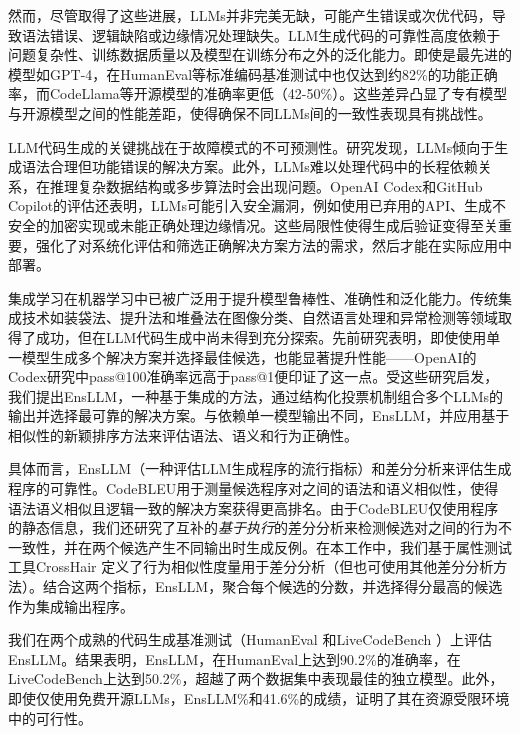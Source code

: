 \documentclass{article}
\newcommand{\tool}{EnsLLM}
\begin{document}
\begin{CJK*}{UTF8}{gbsn}
然而，尽管取得了这些进展，LLMs并非完美无缺，可能产生错误或次优代码，导致语法错误、逻辑缺陷或边缘情况处理缺失\cite{chen2021evaluating}。LLM生成代码的可靠性高度依赖于问题复杂性、训练数据质量以及模型在训练分布之外的泛化能力。即使是最先进的模型如GPT-4，在HumanEval等标准编码基准测试中也仅达到约82\%的功能正确率，而CodeLlama等开源模型的准确率更低（42-50\%）\cite{bubeck2023sparks, ziemniak2023codellama}。这些差异凸显了专有模型与开源模型之间的性能差距，使得确保不同LLMs间的一致性表现具有挑战性。

LLM代码生成的关键挑战在于故障模式的不可预测性。研究发现，LLMs倾向于生成语法合理但功能错误的解决方案\cite{li2022competition}。此外，LLMs难以处理代码中的长程依赖关系，在推理复杂数据结构或多步算法时会出现问题。OpenAI Codex和GitHub Copilot的评估还表明，LLMs可能引入安全漏洞，例如使用已弃用的API、生成不安全的加密实现或未能正确处理边缘情况\cite{pearce2022asleep}。这些局限性使得生成后验证变得至关重要，强化了对系统化评估和筛选正确解决方案方法的需求，然后才能在实际应用中部署。

集成学习在机器学习中已被广泛用于提升模型鲁棒性、准确性和泛化能力\cite{mienye2022survey}。传统集成技术如装袋法、提升法和堆叠法在图像分类、自然语言处理和异常检测等领域取得了成功，但在LLM代码生成中尚未得到充分探索。先前研究表明，即使使用单一模型生成多个解决方案并选择最佳候选，也能显著提升性能——OpenAI的Codex研究中pass@100准确率远高于pass@1便印证了这一点\cite{chen2021evaluating}。受这些研究启发，我们提出\tool，一种基于集成的方法，通过结构化投票机制组合多个LLMs的输出并选择最可靠的解决方案。与依赖单一模型输出不同，\tool{}，并应用基于相似性的新颖排序方法来评估语法、语义和行为正确性。

具体而言，\tool{} \cite{codebleu}（一种评估LLM生成程序的流行指标）和差分分析来评估生成程序的可靠性。CodeBLEU用于测量候选程序对之间的语法和语义相似性，使得语法语义相似且逻辑一致的解决方案获得更高排名。由于CodeBLEU仅使用程序的静态信息，我们还研究了互补的{\em 基于执行}的差分分析来检测候选对之间的行为不一致性，并在两个候选产生不同输出时生成反例。在本工作中，我们基于属性测试工具CrossHair \cite{crosshair}定义了行为相似性度量用于差分分析（但也可使用其他差分分析方法\cite{hydiff, lahiri2010differential}）。结合这两个指标，\tool{}，聚合每个候选的分数，并选择得分最高的候选作为集成输出程序。

我们在两个成熟的代码生成基准测试（HumanEval \cite{humaneval}和LiveCodeBench \cite{livecodebench}）上评估\tool。结果表明，\tool{}，在HumanEval上达到90.2\%的准确率，在LiveCodeBench上达到50.2\%，超越了两个数据集中表现最佳的独立模型。此外，即使仅使用免费开源LLMs，\tool{}\%和41.6\%的成绩，证明了其在资源受限环境中的可行性。


\end{CJK*}
\end{document}
